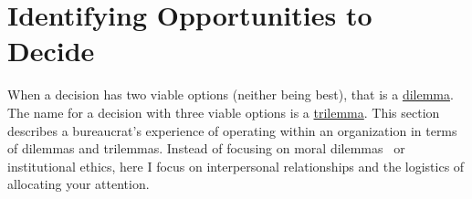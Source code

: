 \section{Identifying Opportunities to Decide\label{sec:dilemma-trilemma}}



When a decision has two viable options (neither being best), that is a \href{https://en.wikipedia.org/wiki/Dilemma}{dilemma}. 
\iftoggle{WPinmargin}{\marginpar{[Wikipedia] dilemma}}{}
The name for a decision with three viable options is a \href{https://en.wikipedia.org/wiki/Trilemma}{trilemma}. 
This section describes a bureaucrat's experience of operating within an organization in terms of dilemmas and trilemmas. Instead of focusing on moral dilemmas~\cite{2017_Zacka} or institutional ethics, here I focus on interpersonal relationships and the logistics of allocating your attention. 

